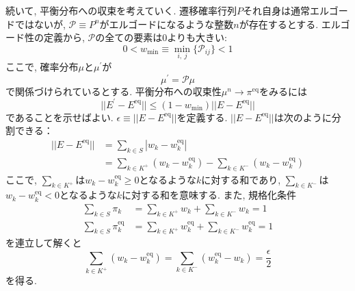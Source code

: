 続いて, 平衡分布への収束を考えていく.
遷移確率行列$P$それ自身は通常エルゴードではないが, $\mathcal{P} \equiv P^{n}$がエルゴードになるような整数$n$が存在するとする.
エルゴード性の定義から, $\mathcal{P}$の全ての要素は0よりも大きい:
\begin{equation}
    0 < w_{\min} \equiv \min_{i,~j} \{ \mathcal{P}_{ij} \} < 1
\end{equation}
ここで, 確率分布$\mu$と$\mu^{\prime}$が
\begin{equation}
    \mu^{\prime} = \mathcal{P} \mu
\end{equation}
で関係づけられているとする.
平衡分布への収束性$\mu^{n} \to \pi^{\mathrm{eq}}$をみるには
\begin{equation}
    || E^{\prime} - E^{\mathrm{eq}} ||
    \le
    (1 - w_{\min}) || E - E^{\mathrm{eq}} ||
\end{equation}
であることを示せばよい.
$\epsilon \equiv || E - E^{\mathrm{eq}} ||$を定義する.
$|| E - E^{\mathrm{eq}} ||$は次のように分割できる：
\begin{align}
    || E - E^{\mathrm{eq}} ||
    &=
    \sum_{k \in S} | w_{k} - w_{k}^{\mathrm{eq}} | \\
    &=
    \sum_{k \in K^{+}} (w_{k} - w_{k}^{\mathrm{eq}}) -
    \sum_{k \in K^{-}} (w_{k} - w_{k}^{\mathrm{eq}})
\end{align}
ここで, $\sum_{k \in K^{+}}$は$w_{k} - w_{k}^{\mathrm{eq}} \ge 0$となるような$k$に対する和であり, $\sum_{k \in K^{-}}$は$w_{k} - w_{k}^{\mathrm{eq}} < 0$となるような$k$に対する和を意味する.
また, 規格化条件
\begin{align}
    \sum_{k \in S} \pi_{k}
    &= \sum_{k \in K^{+}} w_{k} + \sum_{k \in K^{-}} w_{k} = 1
    \\
    \sum_{k \in S} \pi_{k}^{\mathrm{eq}}
    &= \sum_{k \in K^{+}} w_{k}^{\mathrm{eq}} + \sum_{k \in K^{-}} w_{k}^{\mathrm{eq}} = 1
\end{align}
を連立して解くと
\begin{equation}
    \sum_{k \in K^{+}} (w_{k} - w_{k}^{\mathrm{eq}})
    =
    \sum_{k \in K^{-}} (w_{k}^{\mathrm{eq}} - w_{k} )
    =
    \frac{\epsilon}{2}
    \label{Eq:sum-probdist-w}
\end{equation}
を得る.

